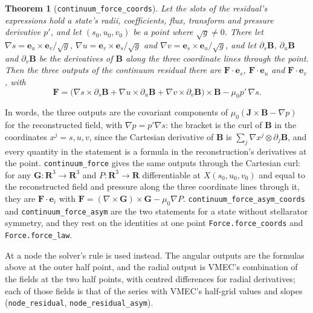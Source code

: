 \documentclass[11pt]{article}
\newcommand{\code}[1]{\texttt{#1}}
\newcommand{\sqg}{\sqrt{g}}
\newtheorem{theorem}{Theorem}
\begin{document}
\begin{theorem}[\code{continuum\_force\_coords}]
Let the slots of the residual's expressions hold a state's radii, coefficients,
flux, transform and pressure derivative $p'$, and let $(s_0,u_0,v_0)$ be a point
where $\sqg\neq0$. There let $\nabla s=\mathbf{e}_u\times\mathbf{e}_v/\sqg$,
$\nabla u=\mathbf{e}_v\times\mathbf{e}_s/\sqg$ and
$\nabla v=\mathbf{e}_s\times\mathbf{e}_u/\sqg$, and let $\partial_s\mathbf{B}$,
$\partial_u\mathbf{B}$ and $\partial_v\mathbf{B}$ be the derivatives of
$\mathbf{B}$ along the three coordinate lines through the point. Then the three
outputs of the continuum residual there are $\mathbf{F}\cdot\mathbf{e}_s$,
$\mathbf{F}\cdot\mathbf{e}_u$ and $\mathbf{F}\cdot\mathbf{e}_v$, with
\begin{equation}
\mathbf{F}=\bigl(\nabla s\times\partial_s\mathbf{B}+\nabla u\times\partial_u\mathbf{B}
+\nabla v\times\partial_v\mathbf{B}\bigr)\times\mathbf{B}-\mu_0p'\,\nabla s.
\end{equation}
\end{theorem}

\noindent In words, the three outputs are the covariant components of
$\mu_0(\mathbf{J}\times\mathbf{B}-\nabla p)$ for the reconstructed field, with
$\nabla p=p'\nabla s$: the bracket is the curl of $\mathbf{B}$ in the
coordinates $x^j=s,u,v$, since the Cartesian derivative of $\mathbf{B}$ is
$\sum_j\nabla x^j\otimes\partial_j\mathbf{B}$, and every quantity in the
statement is a formula in the reconstruction's derivatives at the point.
\code{continuum\_force} gives the same outputs through the Cartesian curl: for
any $\mathbf{G}:\mathbf{R}^3\to\mathbf{R}^3$ and $P:\mathbf{R}^3\to\mathbf{R}$
differentiable at $X(s_0,u_0,v_0)$ and equal to the reconstructed field and
pressure along the three coordinate lines through it, they are
$\mathbf{F}\cdot\mathbf{e}_i$ with
$\mathbf{F}=(\nabla\times\mathbf{G})\times\mathbf{G}-\mu_0\nabla P$.
\code{continuum\_force\_asym\_coords} and \code{continuum\_force\_asym} are the
two statements for a state without stellarator symmetry, and they rest on the
identities at one point \code{Force.force\_coords} and \code{Force.force\_law}.

At a node the solver's rule is used instead. The angular outputs are the
formulas above at the outer half point, and the radial output is VMEC's
combination of the fields at the two half points, with centred differences for
radial derivatives; each of those fields is that of the series with VMEC's
half-grid values and slopes (\code{node\_residual}, \code{node\_residual\_asym}).
\end{document}
